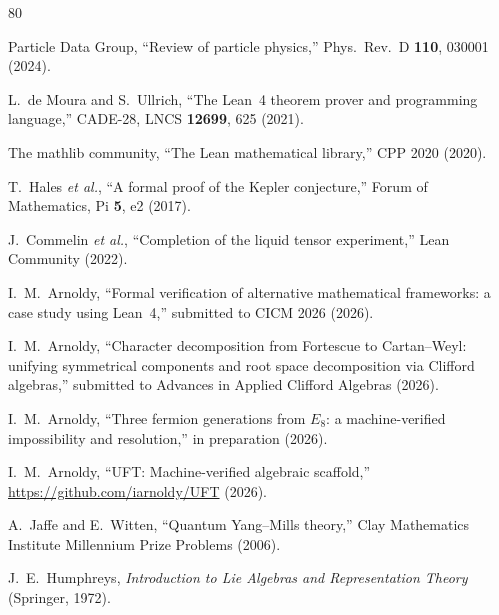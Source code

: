 \documentclass[aps,prd,twocolumn,showpacs,preprintnumbers,superscriptaddress,floatfix]{revtex4-2}
\begin{document}
\begin{thebibliography}{80}

Particle Data Group,
``Review of particle physics,''
Phys.\ Rev.\ D \textbf{110}, 030001 (2024).


L.~de Moura and S.~Ullrich,
``The Lean~4 theorem prover and programming language,''
CADE-28, LNCS \textbf{12699}, 625 (2021).

The mathlib community,
``The Lean mathematical library,''
CPP 2020 (2020).

T.~Hales \textit{et al.},
``A formal proof of the Kepler conjecture,''
Forum of Mathematics, Pi \textbf{5}, e2 (2017).

J.~Commelin \textit{et al.},
``Completion of the liquid tensor experiment,''
Lean Community (2022).


I.~M.~Arnoldy,
``Formal verification of alternative mathematical frameworks:
a case study using Lean~4,''
submitted to CICM 2026 (2026).

I.~M.~Arnoldy,
``Character decomposition from Fortescue to Cartan--Weyl:
unifying symmetrical components and root space decomposition
via Clifford algebras,''
submitted to Advances in Applied Clifford Algebras (2026).

I.~M.~Arnoldy,
``Three fermion generations from $E_8$: a machine-verified
impossibility and resolution,''
in preparation (2026).

I.~M.~Arnoldy,
``UFT: Machine-verified algebraic scaffold,''
\url{https://github.com/iarnoldy/UFT} (2026).


A.~Jaffe and E.~Witten,
``Quantum Yang--Mills theory,''
Clay Mathematics Institute Millennium Prize Problems (2006).


J.~E.~Humphreys,
\textit{Introduction to Lie Algebras and Representation Theory}
(Springer, 1972).

\end{thebibliography}
\end{document}
